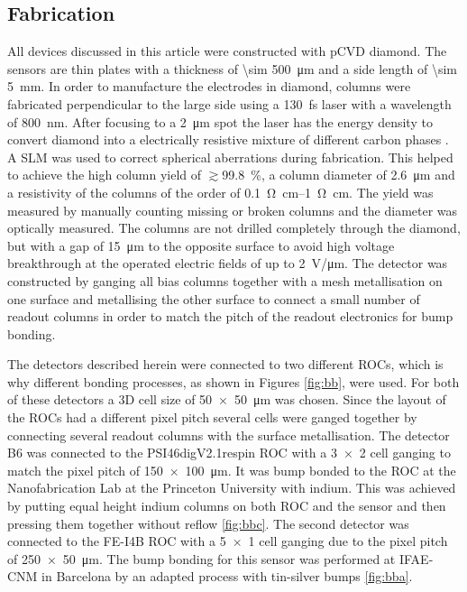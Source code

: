 \subsection{Fabrication}
All devices discussed in this article were constructed with \ac{pCVD} diamond. The sensors are thin plates with a thickness of \SI{\sim 500}{\um} and a side length of \SI{\sim 5}{\mm}. In order to manufacture the electrodes in diamond, columns were fabricated perpendicular to the large side using a \SI{130}{\femto\second} laser with a wavelength of \SI{800}{\nano\meter}. After focusing to a \SI{2}{\um} spot the laser has the energy density to convert diamond into a electrically resistive mixture of different carbon phases \cite{3dfab}. A \ac{SLM} \cite{slm} was used to correct spherical aberrations during fabrication. This helped to achieve the high column yield of $\gtrsim$\SI{ 99.8}{\%}, a column diameter of \SI{2.6}{\micro\meter} and a resistivity of the columns of the order of \SIrange{.1}{1}{\ohm\cm}. The yield was measured by manually counting missing or broken columns and the diameter was optically measured. The columns are not drilled completely through the diamond, but with a gap of \SI{15}{\micro\meter} to the opposite surface to avoid high voltage breakthrough at the operated electric fields of up to \SI{2}{\volt/\um}. The detector was constructed by ganging all bias columns together with a mesh metallisation on one surface and metallising the other surface to connect a small number of readout columns in order to match the pitch of the readout electronics for bump bonding.\par
The detectors described herein were connected to two different \acp{ROC}, which is why different bonding processes, as shown in Figures \ref{fig:bb}, were used. For both of these detectors a 3D cell size of \SI{50x50}{\micro\meter} was chosen. Since the layout of the \acp{ROC} had a different pixel pitch several cells were ganged together by connecting several readout columns with the surface metallisation. The detector B6 was connected to the PSI46digV2.1respin \ac{ROC} \cite{kornmayer} with a \SI{3x2}{} cell ganging to match the pixel pitch of \SI{150x100}{\micro\meter}. It was bump bonded to the \ac{ROC} at the Nanofabrication Lab at the Princeton University with indium. This was achieved by putting equal height indium columns on both \ac{ROC} and the sensor and then pressing them together without reflow \ref{fig:bbc}. The second detector was connected to the FE-I4B \ac{ROC} \cite{fei4} with a \SI{5x1}{} cell ganging due to the pixel pitch of \SI{250x50}{\micro\meter}. The bump bonding for this sensor was performed at IFAE-CNM in Barcelona by an adapted process with tin-silver bumps \ref{fig:bba}.\par

